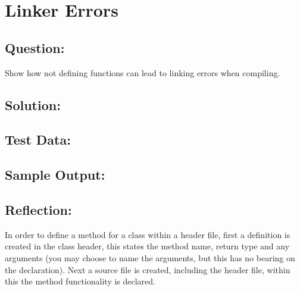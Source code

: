 \documentclass[Lab-D.tex]{subfiles}
\begin{document}
    \section{Linker Errors}
        \subsection*{Question:}
            Show how not defining functions can lead to linking errors when 
            compiling.
            
        \subsection*{Solution:}

        \subsection*{Test Data:}
        
        \subsection*{Sample Output:}

        \subsection*{Reflection:}
            In order to define a method for a class within a header file,
            first a definition is created in the class header,
            this states the method name, return type and any arguments
            (you may choose to name the arguments, but this has no bearing on the declaration).
            Next a source file is created, including the header file,
            within this the method functionality is declared.
\end{document}
